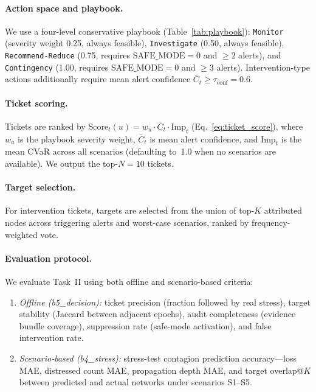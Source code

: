 \paragraph{Action space and playbook.}
We use a four-level conservative playbook (Table~\ref{tab:playbook}): \texttt{Monitor} (severity weight 0.25, always feasible), \texttt{Investigate} (0.50, always feasible), \texttt{Recommend-Reduce} (0.75, requires $\mathrm{SAFE\_MODE}=0$ and $\ge 2$ alerts), and \texttt{Contingency} (1.00, requires $\mathrm{SAFE\_MODE}=0$ and $\ge 3$ alerts). Intervention-type actions additionally require mean alert confidence $\bar{C}_t \ge \tau_{\mathrm{conf}}=0.6$.

\paragraph{Ticket scoring.}
Tickets are ranked by $\mathrm{Score}_t(u) = w_u \cdot \bar{C}_t \cdot \mathrm{Imp}_t$ (Eq.~\eqref{eq:ticket_score}), where $w_u$ is the playbook severity weight, $\bar{C}_t$ is mean alert confidence, and $\mathrm{Imp}_t$ is the mean CVaR across all scenarios (defaulting to~1.0 when no scenarios are available). We output the top-$N=10$ tickets.

\paragraph{Target selection.}
For intervention tickets, targets are selected from the union of top-$K$ attributed nodes across triggering alerts and worst-case scenarios, ranked by frequency-weighted vote.

\paragraph{Evaluation protocol.}
We evaluate Task~II using both offline and scenario-based criteria:
\begin{enumerate}[leftmargin=*,itemsep=1pt]
    \item \emph{Offline (b5_decision):} ticket precision (fraction followed by real stress), target stability (Jaccard between adjacent epochs), audit completeness (evidence bundle coverage), suppression rate (safe-mode activation), and false intervention rate.
    \item \emph{Scenario-based (b4_stress):} stress-test contagion prediction accuracy---loss MAE, distressed count MAE, propagation depth MAE, and target overlap@$K$ between predicted and actual networks under scenarios S1--S5.
\end{enumerate}


